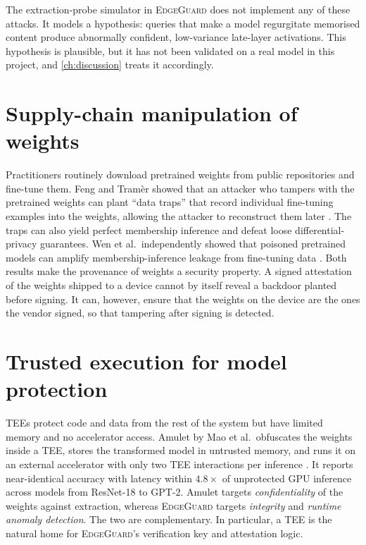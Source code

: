 The extraction-probe simulator in \textsc{EdgeGuard} does not implement any of these attacks.
It models a hypothesis: queries that make a model regurgitate memorised content produce
abnormally confident, low-variance late-layer activations. This hypothesis is plausible, but it
has not been validated on a real model in this project, and \cref{ch:discussion} treats it
accordingly.

\section{Supply-chain manipulation of weights}
\label{sec:rw:supply}

Practitioners routinely download pretrained weights from public repositories and fine-tune
them. Feng and Tram\`er showed that an attacker who tampers with the pretrained weights can
plant ``data traps'' that record individual fine-tuning examples into the weights, allowing the
attacker to reconstruct them later \cite{feng2024privacy}. The traps can also yield perfect
membership inference and defeat loose differential-privacy guarantees. Wen et al.\
independently showed that poisoned pretrained models can amplify membership-inference leakage
from fine-tuning data \cite{wen2024privacy}. Both results make the provenance of weights a
security property. A signed attestation of the weights shipped to a device cannot by itself
reveal a backdoor planted before signing. It can, however, ensure that the weights on the device
are the ones the vendor signed, so that tampering after signing is detected.

\section{Trusted execution for model protection}
\label{sec:rw:tee}

TEEs protect code and data from the rest of the system but have limited memory and no
accelerator access. Amulet by Mao et al.\ obfuscates the weights inside a TEE, stores the
transformed model in untrusted memory, and runs it on an external accelerator with only two TEE
interactions per inference \cite{mao2025amulet}. It reports near-identical accuracy with latency
within $4.8\times$ of unprotected GPU inference across models from ResNet-18 to GPT-2.
Amulet targets \emph{confidentiality} of the weights against extraction, whereas
\textsc{EdgeGuard} targets \emph{integrity} and \emph{runtime anomaly detection}. The two are
complementary. In particular, a TEE is the natural home for \textsc{EdgeGuard}'s verification
key and attestation logic.

